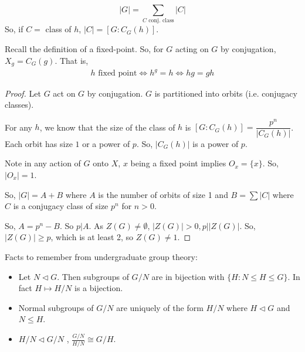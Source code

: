 \documentclass{report}
\begin{document}

$$|G| = \sum_{C \text{ conj. class} }|C|$$
So, if $C = $ class of $h$, $|C| = [G : C_G(h)]$.

Recall the definition of a fixed-point. So, for $G$ acting on $G$ by conjugation, $X_g = C_G(g)$. That is,
\begin{align*}
    h \text{ fixed point} \iff h^g = h \iff hg = gh \tag{for all $g$}
\end{align*}
\begin{proof}
    Let $G$ act on $G$ by conjugation. $G$ is partitioned into orbits (i.e. conjugacy classes). 

    For any $h$, we know that the size of the class of $h$ is $[G : C_G(h)]= \dfrac{p^n}{|C_G(h)|}$. Each orbit has size $1$ or a power of $p$. So, $|C_G(h)|$ is a power of $p$.

    Note in any action of $G$ onto $X$, $x$ being a fixed point implies $O_x = \{x\}$. So, $|O_x| = 1$.

    So, $|G| = A + B$ where $A$ is the number of orbits of size 1 and $B = \sum |C|$ where $C$ is a conjugacy class of size $p^n$ for $n > 0$. 

    So, $A = p^n - B$. So $p | A$. As $Z(G) \neq \emptyset$, $|Z(G)| > 0, p | |Z(G)|$. So, $|Z(G)| \geq p$, which is at least 2, so $Z(G) \neq 1$.
\end{proof}

Facts to remember from undergraduate group theory:
\begin{itemize}
    \item Let $N \lhd G$. Then subgroups of $G/N$ are in bijection with $\{H : N \leq H \leq G\}$. In fact $H \mapsto H/N$ is a bijection.
    \item Normal subgroups of $G/N$ are uniquely of the form $H/N$ where $H \lhd G$ and $N \leq H$.
    \item $H/N \lhd G/N$ , $\frac{G/N}{H/N} \cong G/H$.
\end{itemize}
\newpage
\end{document}
